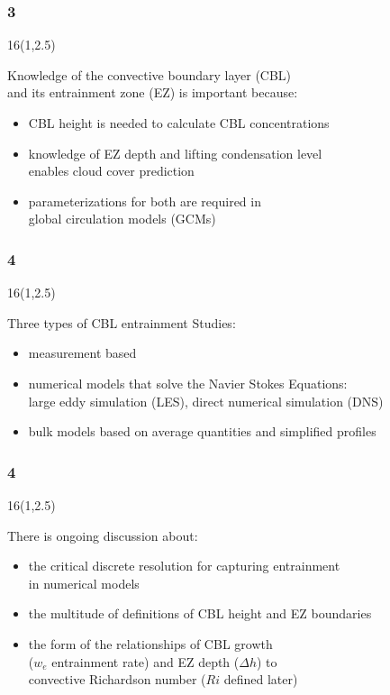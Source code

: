 \documentclass{beamer}
\newcommand\FrameText[1]{
\begin{textblock}{16}(1,2.5)
\raggedright #1
\end{textblock}}
\begin{document}
\begin{frame}
\frametitle{3}
\fontsize{12pt}{7.2}\selectfont
\FrameText{Knowledge of the convective boundary layer (CBL)\\
 and its entrainment zone (EZ) is important because:
 \vspace{10mm}
\begin{itemize}
\item CBL height is needed to calculate CBL concentrations
\vspace{10mm}
\item knowledge of EZ depth and lifting condensation level\\
 enables cloud cover prediction
\vspace{10mm}
\item parameterizations for both are required in\\ 
global circulation models (GCMs)
\end{itemize}
}
\end{frame}

\begin{frame}
\frametitle{4}
\fontsize{12pt}{7.2}\selectfont
\FrameText{Three types of CBL entrainment Studies:
\vspace{10mm}
\begin{itemize}
\item measurement based
\vspace{10mm} 
\item numerical models that solve the Navier Stokes Equations:\\
large eddy simulation (LES), direct numerical simulation (DNS)
\vspace{10mm}
\item bulk models based on average quantities and simplified profiles
\end{itemize}
}

\end{frame}
\begin{frame}
\frametitle{4}
\fontsize{12pt}{7.2}\selectfont
\FrameText{There is ongoing discussion about:
\vspace{10mm}
\begin{itemize}
\item the critical discrete resolution for capturing entrainment\\
in numerical models
\vspace{10mm}
\item the multitude of definitions of CBL height and EZ boundaries
\vspace{10mm}
\item the form of the relationships of CBL growth\\ 
($w_{e}$ entrainment rate) and EZ depth ($\Delta h$)  to \\
convective Richardson number ($Ri$ defined later)
\end{itemize}
}
\end{frame}
\end{document}
